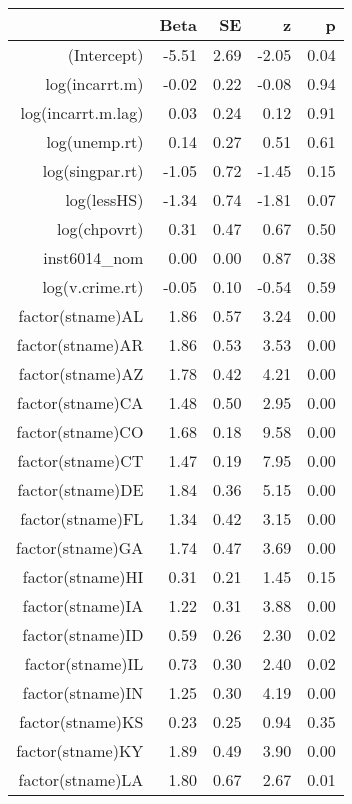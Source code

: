 \begin{table}[ht]
\centering
\begin{tabular}{rrrrr}
  \hline
 & Beta & SE & z & p \\ 
  \hline
(Intercept) & -5.51 & 2.69 & -2.05 & 0.04 \\ 
  log(incarrt.m) & -0.02 & 0.22 & -0.08 & 0.94 \\ 
  log(incarrt.m.lag) & 0.03 & 0.24 & 0.12 & 0.91 \\ 
  log(unemp.rt) & 0.14 & 0.27 & 0.51 & 0.61 \\ 
  log(singpar.rt) & -1.05 & 0.72 & -1.45 & 0.15 \\ 
  log(lessHS) & -1.34 & 0.74 & -1.81 & 0.07 \\ 
  log(chpovrt) & 0.31 & 0.47 & 0.67 & 0.50 \\ 
  inst6014\_nom & 0.00 & 0.00 & 0.87 & 0.38 \\ 
  log(v.crime.rt) & -0.05 & 0.10 & -0.54 & 0.59 \\ 
  factor(stname)AL & 1.86 & 0.57 & 3.24 & 0.00 \\ 
  factor(stname)AR & 1.86 & 0.53 & 3.53 & 0.00 \\ 
  factor(stname)AZ & 1.78 & 0.42 & 4.21 & 0.00 \\ 
  factor(stname)CA & 1.48 & 0.50 & 2.95 & 0.00 \\ 
  factor(stname)CO & 1.68 & 0.18 & 9.58 & 0.00 \\ 
  factor(stname)CT & 1.47 & 0.19 & 7.95 & 0.00 \\ 
  factor(stname)DE & 1.84 & 0.36 & 5.15 & 0.00 \\ 
  factor(stname)FL & 1.34 & 0.42 & 3.15 & 0.00 \\ 
  factor(stname)GA & 1.74 & 0.47 & 3.69 & 0.00 \\ 
  factor(stname)HI & 0.31 & 0.21 & 1.45 & 0.15 \\ 
  factor(stname)IA & 1.22 & 0.31 & 3.88 & 0.00 \\ 
  factor(stname)ID & 0.59 & 0.26 & 2.30 & 0.02 \\ 
  factor(stname)IL & 0.73 & 0.30 & 2.40 & 0.02 \\ 
  factor(stname)IN & 1.25 & 0.30 & 4.19 & 0.00 \\ 
  factor(stname)KS & 0.23 & 0.25 & 0.94 & 0.35 \\ 
  factor(stname)KY & 1.89 & 0.49 & 3.90 & 0.00 \\ 
  factor(stname)LA & 1.80 & 0.67 & 2.67 & 0.01 \\ 

\end{tabular}
\end{table}
